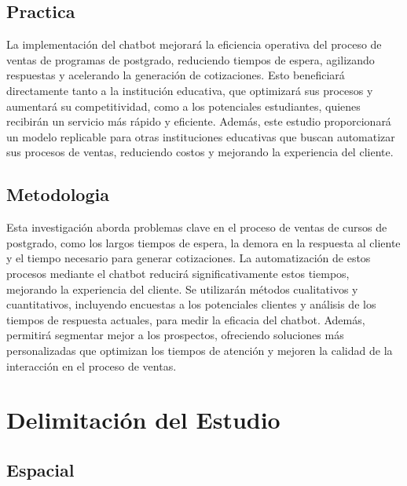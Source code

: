 \documentclass[10pt,a4paper]{article}
\begin{document}
 

    \subsection{Practica}
	La implementación del chatbot mejorará la eficiencia operativa del proceso de ventas de programas de postgrado, reduciendo tiempos de espera, agilizando respuestas y acelerando la generación de cotizaciones. Esto beneficiará directamente tanto a la institución educativa, que optimizará sus procesos y aumentará su competitividad, como a los potenciales estudiantes, quienes recibirán un servicio más rápido y eficiente. Además, este estudio proporcionará un modelo replicable para otras instituciones educativas que buscan automatizar sus procesos de ventas, reduciendo costos y mejorando la experiencia del cliente.

  

    \subsection{Metodologia}
	Esta investigación aborda problemas clave en el proceso de ventas de cursos de postgrado, como los largos tiempos de espera, la demora en la respuesta al cliente y el tiempo necesario para generar cotizaciones. La automatización de estos procesos mediante el chatbot reducirá significativamente estos tiempos, mejorando la experiencia del cliente. Se utilizarán métodos cualitativos y cuantitativos, incluyendo encuestas a los potenciales clientes y análisis de los tiempos de respuesta actuales, para medir la eficacia del chatbot. Además, permitirá segmentar mejor a los prospectos, ofreciendo soluciones más personalizadas que optimizan los tiempos de atención y mejoren la calidad de la interacción en el proceso de ventas.

	\section{Delimitación del Estudio}
		    
	\subsection{Espacial}
\end{document}
